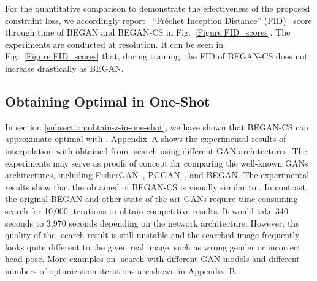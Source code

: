\documentclass[runningheads]{llncs}
\begin{document}
    For the quantitative comparison to demonstrate the effectiveness of the proposed constraint loss, we accordingly report \, ``Fréchet Inception Distance'' (FID)~\cite{HeuselRUNH17} score through time of BEGAN and BEGAN-CS in Fig.~\ref{Figure:FID_scores}. The experiments are conducted at  resolution. It can be seen in Fig.~\ref{Figure:FID_scores} that, during training, the FID of BEGAN-CS does not increase drastically as BEGAN. 
    
    \subsection{Obtaining Optimal  in One-Shot}
    
    In section \ref{subsection:obtain-z-in-one-shot}, we have shown that BEGAN-CS can approximate optimal  with .  Appendix~A shows the experimental results of interpolation with obtained  from -search using different GAN architectures. The experiments may serve as proofs of concept for comparing the well-known GANs architectures, including FisherGAN~\cite{FisherGAN}, PGGAN~\cite{PGGAN}, and BEGAN. The experimental results show that the obtained  of BEGAN-CS is visually similar to . In contrast, the original BEGAN and other state-of-the-art GANs require time-consuming -search for 10{,}000 iterations to obtain competitive results. It would take 340 seconds to 3{,}970 seconds depending on the network architecture. However, the quality of the -search result is still unstable and the searched image frequently looks quite different to the given real image, such as wrong gender or incorrect head pose. More examples on -search with different GAN models and different numbers of optimization iterations are shown in Appendix~B.
    
\end{document}
